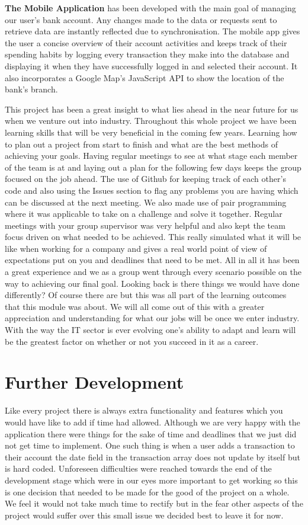 \textbf{The Mobile Application} has been developed with the main goal of managing our user’s bank account. Any changes made to the data or requests sent to retrieve data are instantly reflected due to synchronisation. The mobile app gives the user a concise overview of their account activities and keeps track of their spending habits by logging every transaction they make into the database and displaying it when they have successfully logged in and selected their account. It also incorporates a Google Map’s JavaScript API to show the location of the bank’s branch.

This project has been a great insight to what lies ahead in the near future for us when we venture out into industry. Throughout this whole project we have been learning skills that will be very beneficial in the coming few years. Learning how to plan out a project from start to finish and what are the best methods of achieving your goals. Having regular meetings to see at what stage each member of the team is at and laying out a plan for the following few days keeps the group focused on the job ahead. The use of Github for keeping track of each other’s code and also using the Issues section to flag any problems you are having which can be discussed at the next meeting. We also made use of pair programming where it was applicable to take on a challenge and solve it together. Regular meetings with your group supervisor was very helpful and also kept the team focus driven on what needed to be achieved. This really simulated what it will be like when working for a company and gives a real world point of view of expectations put on you and deadlines that need to be met. All in all it has been a great experience and we as a group went through every scenario possible on the way to achieving our final goal. Looking back is there things we would have done differently? Of course there are but this was all part of the learning outcomes that this module was about. We will all come out of this with a greater appreciation and understanding for what our jobs will be once we enter industry. With the way the IT sector is ever evolving one’s ability to adapt and learn will be the greatest factor on whether or not you succeed in it as a career.

\section{Further Development}

Like every project there is always extra functionality and features which you would have like to add if time had allowed. Although we are very happy with the application there were things for the sake of time and deadlines that we just did not get time to implement. One such thing is when a user adds a transaction to their account the date field in the transaction array does not update by itself but is hard coded. Unforeseen difficulties were reached towards the end of the development stage which were in our eyes more important to get working so this is one decision that needed to be made for the good of the project on a whole. We feel it would not take much time to rectify but in the fear other aspects of the project would suffer over this small issue we decided best to leave it for now.

